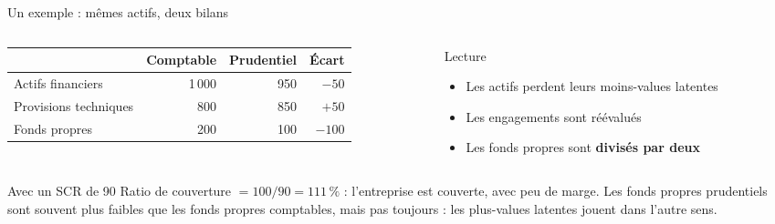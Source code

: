\documentclass[10pt,aspectratio=169]{beamer}
\begin{document}
\begin{frame}{Un exemple : mêmes actifs, deux bilans}
\begin{columns}[T]
\begin{column}{0.52\textwidth}
\begin{table}
\small
\begin{tabular}{lrrr}
\toprule
 & \textbf{Comptable} & \textbf{Prudentiel} & \textbf{Écart} \\
\midrule
Actifs financiers & 1\,000 & 950 & $-50$ \\
Provisions techniques & 800 & 850 & $+50$ \\
Fonds propres & 200 & 100 & $-100$ \\
\bottomrule
\end{tabular}
\end{table}
\end{column}
\begin{column}{0.44\textwidth}
\begin{block}{Lecture}
\begin{itemize}
  \item Les actifs perdent leurs moins-values latentes
  \item Les engagements sont réévalués
  \item Les fonds propres sont \textbf{divisés par deux}
\end{itemize}
\end{block}
\end{column}
\end{columns}
\vspace{0.3cm}
\begin{alertblock}{Avec un SCR de 90}
Ratio de couverture $= 100 / 90 = 111\,\%$ : l'entreprise est couverte, avec peu de marge.
Les fonds propres prudentiels sont souvent plus faibles que les fonds propres comptables, mais
pas toujours : les plus-values latentes jouent dans l'autre sens.
\end{alertblock}
\end{frame}
\end{document}
